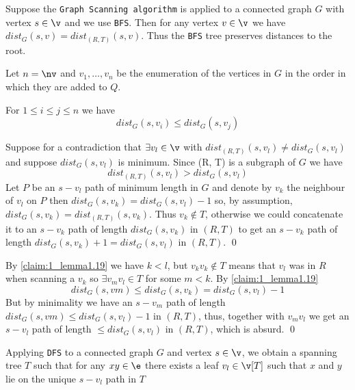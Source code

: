\begin{customlemma}{1.19}
    \label{lemma:1.19}
    Suppose the \texttt{Graph Scanning algorithm} is applied to a connected graph $G$ with vertex $s \in \v$ and we use \texttt{BFS}. Then for any vertex $v \in \v$ we have $dist_G(s, v) = dist_{(R, T)}(s, v)$. Thus the \texttt{BFS} tree preserves distances to the root.
\end{customlemma}
\begin{prf}
    Let $n = \nv$ and $v_1, \dots, v_n$ be the enumeration of the vertices in $G$ in the order in which they are added to $Q$.
    \begin{claim}
        \label{claim:1_lemma1.19}
        For $1 \leq i \leq j \leq n$ we have
        \begin{equation*}
            dist_G(s, v_i) \leq dist_G(s, v_j)
        \end{equation*}
    \end{claim}
    \begin{prf}
        Suppose for a contradiction that $\exists v_l \in \v$ with $dist_{(R, T)}(s, v_l) \neq dist_G(s, v_l)$ and suppose $dist_G(s, v_l)$ is minimum. Since (R, T) is a subgraph of $G$ we have
        \begin{equation*}
            dist_{(R, T)}(s, v_l) > dist_G(s, v_l)
        \end{equation*}
        Let $P$ be an $s - v_l$ path of minimum length in $G$ and denote by $v_k$ the neighbour of $v_l$ on $P$ then $dist_G(s, v_k) = dist_G(s, v_l) - 1$ so, by assumption, $dist_G(s, v_k) = dist_{(R, T)}(s, v_k)$.
        Thus $v_k \notin T$, otherwise we could concatenate it to an $s - v_k$ path of length $dist_G(s, v_k)$ in $(R, T)$ to get an $s - v_k$ path of length $dist_G(s, v_k) + 1 = dist_G(s, v_l)$ in $(R, T)$. \qed
    \end{prf}
    By \ref{claim:1_lemma1.19} we have $k < l$, but $v_kv_k \notin T$ means that $v_l$ was in $R$ when scanning a $v_k$ so $\exists v_mv_l \in T$ for some $m < k$. By \ref{claim:1_lemma1.19}
    \begin{equation*}
        dist_G(s, vm) \leq dist_G(s, v_k) = dist_G(s, v_l) - 1
    \end{equation*}
    But by minimality we have an $s - v_m$ path of length $dist_G(s, vm) \leq dist_G(s, v_l) - 1$ in $(R, T)$, thus, together with $v_mv_l$ we get an $s - v_l$ path of length $\leq dist_G(s, v_l)$ in $(R, T)$, which is absurd. \qed
\end{prf}
\begin{customlemma}{1.20}
    \label{lemma:1.20}
    Applying \texttt{DFS} to a connected graph $G$ and vertex $s \in \v$, we obtain a spanning tree $T$ such that for any $xy \in \e$ there exists a leaf $v_l \in \v[T]$ such that $x$ and $y$ lie on the unique $s - v_l$ path in $T$
\end{customlemma}
